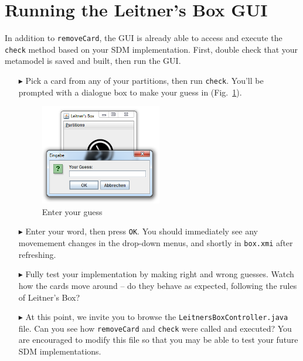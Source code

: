 \newpage
\hypertarget{sec:extendGui}{}
\section{Running the Leitner's Box GUI}
\genHeader

In addition to \texttt{removeCard}, the GUI is already able to access and execute the \texttt{check} method based on your SDM implementation. First, double
check that your metamodel is saved and built, then run the GUI. 

\begin{itemize}
\item[$\blacktriangleright$] Pick a card from any of your partitions, then run \texttt{check}. You'll be prompted with a dialogue box to make your guess in
(Fig.~\ref{eclipse:checkGuess}).

\vspace{0.5cm}

\begin{figure}[htp]
\begin{center}
  \includegraphics[width=0.5\textwidth]{gui_checkGuess}
  \caption{Enter your guess}
  \label{eclipse:checkGuess}
\end{center}
\end{figure}

\item[$\blacktriangleright$] Enter your word, then press \texttt{OK}. You should immediately see any movemement changes in the drop-down menus, and shortly in
\texttt{box.xmi} after refreshing.

\vspace{0.5cm}

\item[$\blacktriangleright$] Fully test your implementation by making right and wrong guesses. Watch how the cards move around -- do they
behave as expected, following the rules of Leitner's Box?

\vspace{0.5cm}

\item[$\blacktriangleright$] At this point, we invite you to browse the \texttt{Leitners\-Box\-Control\-ler.java} file. Can you see how \texttt{removeCard} and
\texttt{check} were called and executed? You are encouraged to modify this file so that you may be able to test your future SDM implementations.

\end{itemize}
